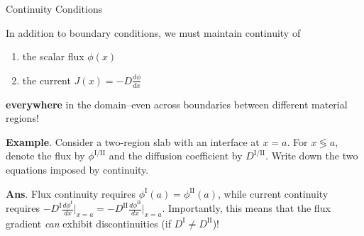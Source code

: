 \documentclass[aspectratio=1610]{beamer}
\begin{document}
\begin{frame}[fragile]{Continuity Conditions}

In addition to boundary conditions, we must maintain continuity of

\begin{enumerate}
 \item the scalar flux $\phi(x)$
 \item the current $J(x) = -D \frac{d\phi}{dx}$
\end{enumerate}

{\bf everywhere} in the domain--even across boundaries between 
different material regions!

\pause 
\vfill 

{\bf Example}. Consider a two-region slab with an interface at $x = a$.  For $x \lessgtr a$, denote the flux by $\phi^{\text{I}/\text{II}}$ and the diffusion coefficient by $D^{\text{I}/\text{II}}$.  Write down the two equations imposed by continuity. 

\pause 

{\bf Ans}. Flux continuity requires $\phi^{\text{I}}(a) = \phi^{\text{II}}(a)$, while current continuity requires 
$-D^{\text{I}} \frac{d\phi^{\text{I}}}{dx}\Big |_{x=a} = -D^{\text{II}} \frac{d\phi^{\text{II}}}{dx}\Big |_{x=a}$.
Importantly, this means that the flux gradient {\it can} exhibit discontinuities (if $D^{\text{I}} \neq D^{\text{II}}$)!

\end{frame}
\end{document}
